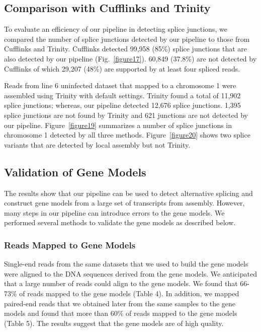 \documentclass[10pt]{article}
\begin{document}
\subsection*{Comparison with Cufflinks and Trinity}
To evaluate an efficiency of our pipeline in detecting splice junctions,
we compared the number of splice junctions detected by our pipeline to those from Cufflinks\cite{Trapnell:2010kd} and Trinity\cite{Grabherr:2011jb}.
Cufflinks detected 99,958 (85\%) splice junctions that are also detected by our pipeline (Fig.~\ref{figure17}).
60,849 (37.8\%) are not detected by Cufflinks of which 29,207 (48\%) are supported by at least four spliced reads.

Reads from line 6 uninfected dataset that mapped to a chromosome 1 were assembled using Trinity with default settings.
Trinity found a total of 11,902 splice junctions; whereas, our pipeline detected 12,676 splice junctions.
1,395 splice junctions are not found by Trinity and 621 junctions are not detected by our pipeline.
Figure~\ref{figure19} summarizes a number of splice junctions in chromosome 1 detected by all three methods.
Figure~\ref{figure20} shows two splice variants that are detected by local assembly but not Trinity.

\subsection*{Validation of Gene Models}

The results show that our pipeline can be used to detect alternative splicing and construct gene models from a large set of transcripts from assembly.
However, many steps in our pipeline can introduce errors to the gene models.
We performed several methods to validate the gene models as described below.

\subsubsection*{Reads Mapped to Gene Models}

Single-end reads from the same datasets that we used to build the gene models were aligned to the DNA sequences derived from the gene models.
We anticipated that a large number of reads could align to the gene models.
We found that 66-73\% of reads mapped to the gene models (Table 4).
In addition, we mapped paired-end reads that we obtained later from the same samples to the gene models and found that more than 60\% of reads mapped to the gene models (Table 5).
The results suggest that the gene models are of high quality.
\end{document}
